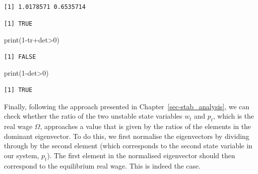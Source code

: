 \documentclass[
  letterpaper,
  DIV=11,
  numbers=noendperiod]{scrreprt}
\newenvironment{Shaded}{\begin{snugshade}}{\end{snugshade}}
\newcommand{\CommentTok}[1]{\textcolor[rgb]{0.37,0.37,0.37}{#1}}
\newcommand{\DecValTok}[1]{\textcolor[rgb]{0.68,0.00,0.00}{#1}}
\newcommand{\FunctionTok}[1]{\textcolor[rgb]{0.28,0.35,0.67}{#1}}
\newcommand{\NormalTok}[1]{\textcolor[rgb]{0.00,0.23,0.31}{#1}}
\newcommand{\OtherTok}[1]{\textcolor[rgb]{0.00,0.23,0.31}{#1}}
\newcommand{\SpecialCharTok}[1]{\textcolor[rgb]{0.37,0.37,0.37}{#1}}
\begin{document}
\begin{verbatim}
[1] 1.0178571 0.6535714
\end{verbatim}

\begin{Shaded}
\end{Shaded}

\begin{verbatim}
[1] TRUE
\end{verbatim}

\begin{Shaded}
\begin{Highlighting}[]
\FunctionTok{print}\NormalTok{(}\DecValTok{1}\SpecialCharTok{{-}}\NormalTok{tr}\SpecialCharTok{+}\NormalTok{det}\SpecialCharTok{\textgreater{}}\DecValTok{0}\NormalTok{)}
\end{Highlighting}
\end{Shaded}

\begin{verbatim}
[1] FALSE
\end{verbatim}

\begin{Shaded}
\begin{Highlighting}[]
\FunctionTok{print}\NormalTok{(}\DecValTok{1}\SpecialCharTok{{-}}\NormalTok{det}\SpecialCharTok{\textgreater{}}\DecValTok{0}\NormalTok{)}
\end{Highlighting}
\end{Shaded}

\begin{verbatim}
[1] TRUE
\end{verbatim}

Finally, following the approach presented in
Chapter~\ref{sec-stab_analysis}, we can check whether the ratio of the
two unstable state variables \(w_t\) and \(p_t\), which is the real wage
\(\Omega\), approaches a value that is given by the ratios of the
elements in the dominant eigenvector. To do this, we first normalise the
eigenvectors by dividing through by the second element (which
corresponds to the second state variable in our system, \(p_t\)). The
first element in the normalised eigenvector should then correspond to
the equilibrium real wage. This is indeed the case.
\end{document}
